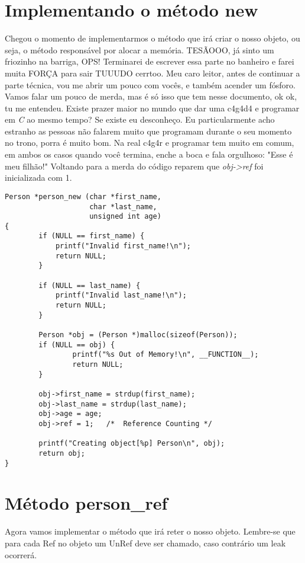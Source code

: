 \section{Implementando o método new}

Chegou o momento de implementarmos o método que irá criar o nosso objeto, ou seja, o método responsável por alocar a memória. TESÃOOO, já sinto um friozinho na barriga, OPS!
Terminarei de escrever essa parte no banheiro e farei muita FORÇA para sair TUUUDO cerrtoo. Meu caro leitor, antes de continuar a parte técnica, vou me abrir um pouco com 
vocês, e também acender um fósforo. Vamos falar um pouco de merda, mas é só isso que tem nesse documento, ok ok, tu me entendeu. Existe prazer maior no mundo que dar uma 
c4g4d4 e programar em \textit{C} ao mesmo tempo? Se existe eu desconheço. Eu particularmente acho estranho as pessoas não falarem muito que programam durante o seu momento no
trono, porra é muito bom. Na real c4g4r e programar tem muito em comum, em ambos os casos quando você termina, enche a boca e fala orgulhoso: "Esse é meu filhão!" Voltando para a
merda do código reparem que \textit{obj->ref} foi inicializada com 1.

\belowcaptionskip=-10pt
\begin{lstlisting}[label=some-code,caption=person\_new()]
Person *person_new (char *first_name, 
                    char *last_name, 
                    unsigned int age)
{
        if (NULL == first_name) {
            printf("Invalid first_name!\n");
            return NULL;
        }

        if (NULL == last_name) {
            printf("Invalid last_name!\n");
            return NULL;
        }

        Person *obj = (Person *)malloc(sizeof(Person));
        if (NULL == obj) {
                printf("%s Out of Memory!\n", __FUNCTION__);
                return NULL;
        }

        obj->first_name = strdup(first_name);
        obj->last_name = strdup(last_name);
        obj->age = age;
        obj->ref = 1;   /*  Reference Counting */

        printf("Creating object[%p] Person\n", obj);
        return obj;
}

\end{lstlisting}

\vspace{50mm}

\section{Método person\_ref}
Agora vamos implementar o método que irá reter o nosso objeto. Lembre-se que para cada Ref no objeto um UnRef deve ser chamado, caso contrário um leak ocorrerá.

